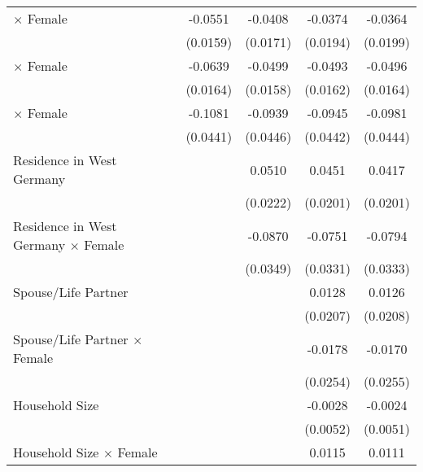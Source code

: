 {\begin{tabular}{l*{4}{c}}
\addlinespace
1997 $\times$ Female&     -0.0551\sym{***}&     -0.0408\sym{**} &     -0.0374\sym{*}  &     -0.0364\sym{*}  \\
                    &    (0.0159)         &    (0.0171)         &    (0.0194)         &    (0.0199)         \\
\addlinespace
1998 $\times$ Female&     -0.0639\sym{***}&     -0.0499\sym{***}&     -0.0493\sym{***}&     -0.0496\sym{***}\\
                    &    (0.0164)         &    (0.0158)         &    (0.0162)         &    (0.0164)         \\
\addlinespace
1999 $\times$ Female&     -0.1081\sym{**} &     -0.0939\sym{**} &     -0.0945\sym{**} &     -0.0981\sym{**} \\
                    &    (0.0441)         &    (0.0446)         &    (0.0442)         &    (0.0444)         \\
\addlinespace
Residence in West Germany&                     &      0.0510\sym{**} &      0.0451\sym{**} &      0.0417\sym{**} \\
                    &                     &    (0.0222)         &    (0.0201)         &    (0.0201)         \\
\addlinespace
Residence in West Germany $\times$ Female&                     &     -0.0870\sym{**} &     -0.0751\sym{**} &     -0.0794\sym{**} \\
                    &                     &    (0.0349)         &    (0.0331)         &    (0.0333)         \\
\addlinespace
Spouse/Life Partner &                     &                     &      0.0128         &      0.0126         \\
                    &                     &                     &    (0.0207)         &    (0.0208)         \\
\addlinespace
Spouse/Life Partner $\times$ Female&                     &                     &     -0.0178         &     -0.0170         \\
                    &                     &                     &    (0.0254)         &    (0.0255)         \\
\addlinespace
Household Size      &                     &                     &     -0.0028         &     -0.0024         \\
                    &                     &                     &    (0.0052)         &    (0.0051)         \\
\addlinespace
Household Size $\times$ Female&                     &                     &      0.0115\sym{*}  &      0.0111         \\

\end{tabular}}
